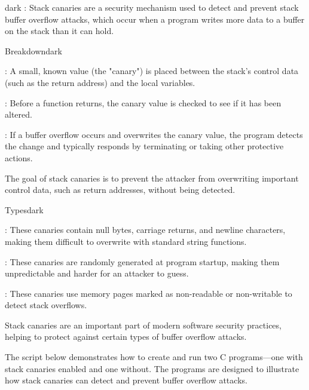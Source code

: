 \label{Stack Canaries}
\begin{baseBoxThree}{}{dark}
    \bigskip
    : Stack canaries are a security mechanism used to detect and prevent stack buffer overflow attacks, which occur when a program writes more data to a buffer on the stack than it can hold.
    \bigskip
    \begin{baseBoxThree}{Breakdown}{dark}
        \smallskip
        \begin{posnexItemize}
            \item[\sA] : A small, known value (the "canary") is placed between the stack's control data (such as the return address) and the local variables.
            \item[\sA] : Before a function returns, the canary value is checked to see if it has been altered.
            \item[\sA] : If a buffer overflow occurs and overwrites the canary value, the program detects the change and typically responds by terminating or taking other protective actions.
        \end{posnexItemize}
        \smallskip
        The goal of stack canaries is to prevent the attacker from overwriting important control data, such as return addresses, without being detected.
        \smallskip
    \end{baseBoxThree}
    \smallskip
    \label{Types of Canaries}
    \begin{baseBoxThree}{Types}{dark}
        \smallskip
        \begin{posnexItemize}
            \item[\sA] : These canaries contain null bytes, carriage returns, and newline characters, making them difficult to overwrite with standard string functions.
            \item[\sA] : These canaries are randomly generated at program startup, making them unpredictable and harder for an attacker to guess.
            \item[\sA] : These canaries use memory pages marked as non-readable or non-writable to detect stack overflows.
        \end{posnexItemize}
        \bigskip
        Stack canaries are an important part of modern software security practices, helping to protect against certain types of buffer overflow attacks.
        \smallskip
    \end{baseBoxThree}
    \bigskip
    The script below demonstrates how to create and run two C programs—one with stack canaries enabled and one without.
    The programs are designed to illustrate how stack canaries can detect and prevent buffer overflow attacks.
    \smallskip
\end{baseBoxThree}

